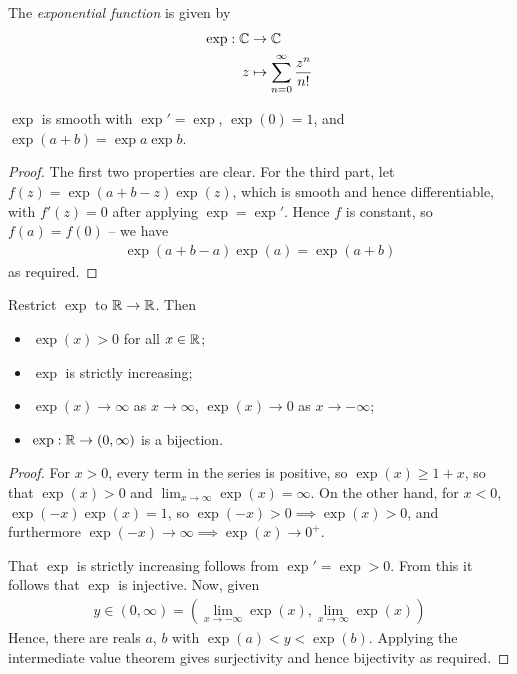 \documentclass{../template/note}
\begin{document}
    \begin{definition}
        The \emph{exponential function} is given by
        \begin{align*}
            \exp: \mathbb C &\to \mathbb C \\
            z &\mapsto \sum_{n=0}^\infty \frac{z^n}{n!}
        \end{align*}
    \end{definition}
    
    \begin{lemma}
        \(\exp\) is smooth with \(\exp' = \exp\), \(\exp(0) = 1\), and \(\exp(a+b) = \exp a \exp b\).
    \end{lemma}
    
    \begin{proof}
        The first two properties are clear. For the third part, let \(f(z) = \exp(a+b-z)\exp(z)\), which is smooth and hence differentiable, with \(f'(z) = 0\) after applying \(\exp = \exp'\). Hence \(f\) is constant, so \(f(a) = f(0)\) -- we have
        \begin{align*}
            \exp(a+b-a)\exp(a) = \exp(a+b)
        \end{align*}
        as required.       
    \end{proof}
    
    \begin{lemma}
        Restrict \(\exp\) to \(\mathbb R \to \mathbb R\). Then
        \begin{itemize}
            \item \(\exp(x) > 0\) for all \(x \in \mathbb R\);
            \item \(\exp\) is strictly increasing;
            \item \(\exp(x) \to \infty\) as \(x \to \infty\), \(\exp(x) \to 0\) as \(x \to -\infty\);
            \item \(\exp: \mathbb R \to (0, \infty)\) is a bijection.
        \end{itemize}
    \end{lemma}
    
    \begin{proof}
        For \(x > 0\), every term in the series is positive, so \(\exp(x) \geq 1 + x\), so that \(\exp(x) > 0\) and \(\lim_{x \to \infty}\exp(x) = \infty\). On the other hand, for \(x < 0\), \(\exp(-x)\exp(x) = 1\), so \(\exp(-x) > 0 \implies \exp(x) > 0\), and furthermore \(\exp(-x) \to \infty \implies \exp(x) \to 0^+\).

        That \(\exp\) is strictly increasing follows from \(\exp' = \exp > 0\). From this it follows that \(\exp\) is injective. Now, given
        \begin{align*}
            y \in (0, \infty) = \left(\lim_{x \to -\infty}\exp(x), \lim_{x \to \infty}\exp(x)\right)
        \end{align*}
        Hence, there are reals \(a\), \(b\) with \(\exp(a) < y < \exp(b)\). Applying the intermediate value theorem gives surjectivity and hence bijectivity as required.               
    \end{proof}
    
\end{document}
